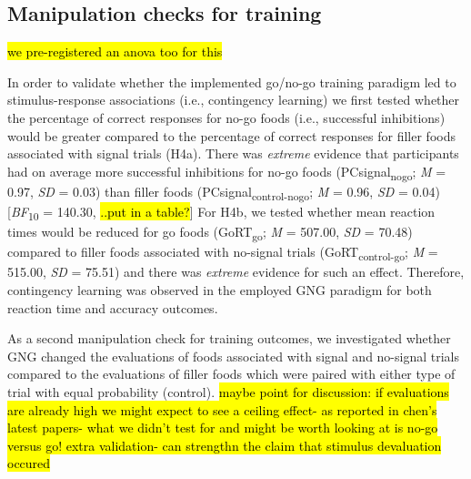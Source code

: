 \documentclass[man,floatsintext]{apa6}
\begin{document}
\hypertarget{manipulation-checks-for-training}{%
\subsection{Manipulation checks for training}\label{manipulation-checks-for-training}}

\par
\hl{we pre-registered an anova too for this}

In order to validate whether the implemented go/no-go training paradigm led to stimulus-response associations (i.e., contingency learning) we first tested whether the percentage of correct responses for no-go foods (i.e., successful inhibitions) would be greater compared to the percentage of correct responses for filler foods associated with signal trials (H4a). There was \emph{extreme} evidence that participants had on average more successful inhibitions for no-go foods (PCsignal\textsubscript{nogo}; \emph{M} = 0.97, \emph{SD} = 0.03) than filler foods
(PCsignal\textsubscript{control-nogo}; \emph{M} = 0.96, \emph{SD} = 0.04) {[}\emph{BF}\textsubscript{10} = 140.30, \hl{..put in a table?}{]} For H4b, we tested whether mean reaction times would be reduced for go foods (GoRT\textsubscript{go}; \emph{M} = 507.00, \emph{SD} = 70.48) compared to filler foods associated with no-signal trials (GoRT\textsubscript{control-go}; \emph{M} = 515.00, \emph{SD} = 75.51) and there was \emph{extreme} evidence for such an effect. Therefore, contingency learning was observed in the employed GNG paradigm for both reaction time and accuracy outcomes.

\par

As a second manipulation check for training outcomes, we investigated whether GNG changed the evaluations of foods associated with signal and no-signal trials compared to the evaluations of filler foods which were paired with either type of trial with equal probability (control). \hl{maybe point for discussion: if evaluations are already high we might expect to see a ceiling effect- as reported in chen's latest papers- what we didn't test for and might be worth looking at is no-go versus go! extra validation- can strengthn the claim that stimulus devaluation occured}
\end{document}
